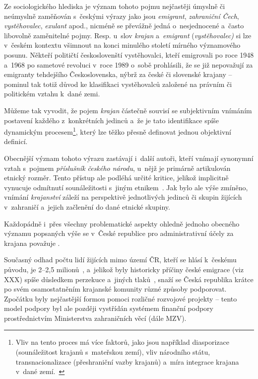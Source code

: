 Ze sociologického hlediska je význam tohoto pojmu nejčastěji úmyslně či neúmyslně zaměňován s~českými výrazy jako jsou \emph{emigrant}, \emph{zahraniční Čech}, \emph{vystěhovalec}, \emph{exulant} apod., nicméně se převážně jedná o~nesjednocené a~často libovolně zaměnitelné pojmy. Resp. u~slov \emph{krajan} a~\emph{emigrant} (\emph{vystěhovalec)} si lze v~českém kontextu všimnout na konci minulého století mírného významového posunu. Někteří političtí českoslovenští vystěhovalci, kteří emigrovali po roce 1948 a~1968 po sametové revoluci v~roce 1989 o~sobě prohlásili, že se již nepovažují za emigranty tehdejšího Československa, nýbrž za české či slovenské krajany -- pominul tak totiž důvod ke klasifikaci vystěhovalců založené na právním či politickém vztahu k~dané zemi.~\parencite{Broucek2017}

Můžeme tak vyvodit, že pojem \emph{krajan} částečně souvisí se subjektivním vnímáním postavení každého z~konkrétních jedinců a~že je tato identifikace spíše dynamickým procesem\footnote{Vliv na tento proces má více faktorů, jako jsou například diasporizace (sounáležitost krajanů s~mateřskou zemí), vliv národního státu, transnacionalizace (přeshraniční vazby krajanů) a~míra integrace krajana v~dané zemí.~\parencite{Broucek2017}}, který lze těžko přesně definovat jednou objektivní definicí.

Obecnější význam tohoto výrazu zastávají i~další autoři, kteří vnímají synonymní vztah s~pojmem \emph{příslušník českého národu}, u~nějž je primárně artikulován etnický rozměr. Tento přístup ale podléhá určité kritice, jelikož implicitně vynucuje odmítnutí sounáležitosti s~jiným etnikem~\parencite{Jakoubek2015}. Jak bylo ale výše zmíněno, vnímání \emph{krajanství} záleží na perspektivě jednotlivých jedinců či skupin žijících v~zahraničí a~jejich začlenění do dané etnické skupiny.

Každopádně i~přes všechny problematické aspekty ohledně jednoho obecného významu popsaných výše se v~České republice pro administrativní účely za krajana považuje .~\parencite{Krajane-mv1}

Současný odhad počtu lidí žijících mimo území ČR, kteří se hlásí k~českému původu, je 2--2,5 milionů~\parencite{Krajane-mv2}, a~jelikož byly historicky příčiny české emigrace (viz XXX) spíše důsledkem perzekuce a~jiných tlaků~\parencite{Vaculik2009a}, snaží se Česká republika krátce po svém osamostatněním krajanské komunity různé způsoby podporovat. Zpočátku byly nejčastější formou pomoci rozličné rozvojové projekty -- tento model podpory byl ale později vystřídán systémem finanční podpory prostřednictvím Ministerstva zahraničních věcí (dále MZV).~\parencite{Broucek2009}

